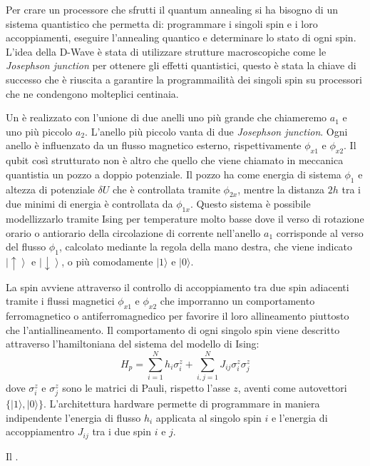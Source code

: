 \cite{QAS}Per crare un processore che sfrutti il quantum annealing si ha bisogno di un sistema quantistico che permetta di: programmare i singoli spin e i loro accoppiamenti, eseguire l'annealing quantico e determinare lo stato di ogni spin. L'idea della D-Wave è stata di utilizzare strutture macroscopiche come le \textit{Josephson junction} per ottenere gli effetti quantistici, questo è stata la chiave di successo che è riuscita a garantire la programmailità dei singoli spin su processori che ne condengono molteplici centinaia.

Un  è realizzato con l'unione di due anelli uno più grande che chiameremo $a_1$ e uno più piccolo $a_2$. L'anello più piccolo vanta di due \textit{Josephson junction}. Ogni anello è influenzato da un flusso magnetico esterno, rispettivamente $\phi_{x1}$ e $\phi_{x2}$. Il qubit così strutturato non è altro che quello che viene chiamato in meccanica quantistia un pozzo a doppio potenziale. Il pozzo ha come energia di sistema $\phi_1$ e altezza di potenziale $\delta U$ che è controllata tramite $\phi_{2x}$, mentre la distanza $2h$ tra i due minimi di energia è controllata da $\phi_{1x}$.
Questo sistema è possibile modellizzarlo tramite Ising per temperature molto basse dove il verso di rotazione orario o antiorario della circolazione di corrente nell'anello $a_1$ corrisponde al verso del flusso $\phi_1$, calcolato mediante la regola della mano destra, che viene indicato $\left|\uparrow \right\rangle$ e $\left|\downarrow \right\rangle$, o più comodamente $|1 \rangle$ e $|0 \rangle$.

La  spin avviene attraverso il controllo di accoppiamento tra due spin adiacenti tramite i flussi magnetici $\phi_{x1}$ e $\phi_{x2}$ che imporranno un comportamento ferromagnetico o antiferromagnedico per favorire il loro allineamento piuttosto che l'antiallineamento.
Il comportamento di ogni singolo spin viene descritto attraverso l'hamiltoniana del sistema del modello di Ising:
$$H_p = \sum_{i=1}^N h_i \sigma_i^z + \sum_{i,j=1}^N J_{ij} \sigma_i^z \sigma_j^z$$
dove $\sigma_i^z$ e $\sigma_j^z$ sono le matrici di Pauli, rispetto l'asse $z$, aventi come autovettori $\{|1\rangle, |0\rangle\}$. L'architettura hardware permette di programmare in maniera indipendente l'energia di flusso $h_i$ applicata al singolo spin $i$ e l'energia di accoppiamentro $J_{ij}$ tra i due spin $i$ e $j$.

Il .

